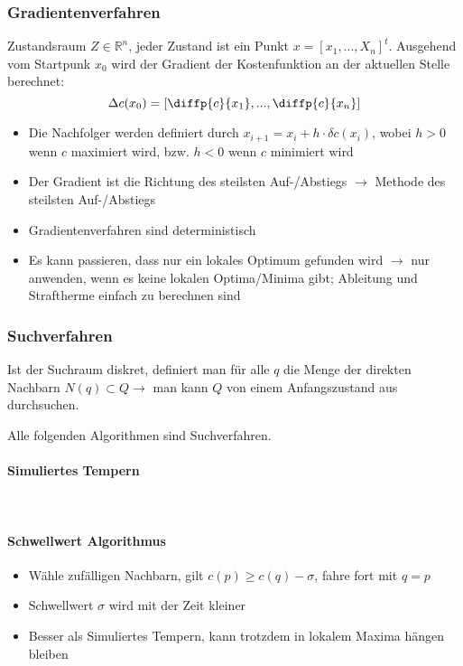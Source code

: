 \subsubsection{Gradientenverfahren}
Zustandsraum \(Z \in \mathbb{R}^n\), jeder Zustand ist ein Punkt \(x = [x_1, ... , X_n]^t\).
Ausgehend vom Startpunk $x_0$ wird der Gradient der Kostenfunktion an der aktuellen Stelle berechnet:
\[\Delta c(x_0) = \left[ \diffp{c}{{x_{1}}}, ... , \diffp{c}{{x_{n}}} \right]\]

\begin{itemize}
	\item Die Nachfolger werden definiert durch \(x_{i+1} = x_i + h \cdot \delta c(x_i)\), wobei \(h > 0\) wenn \(c\) maximiert wird, bzw. \(h < 0\) wenn \(c\) minimiert wird
	\item Der Gradient ist die Richtung des steilsten Auf-/Abstiegs $\rightarrow$ Methode des steilsten Auf-/Abstiegs
	\item Gradientenverfahren sind deterministisch
	\item Es kann passieren, dass nur ein lokales Optimum gefunden wird \(\rightarrow\) nur anwenden, wenn es keine lokalen Optima/Minima gibt; Ableitung und Straftherme einfach zu berechnen sind
\end{itemize}

\subsubsection{Suchverfahren}
Ist der Suchraum diskret, definiert man für alle \(q\) die Menge der direkten Nachbarn \(N(q) \subset Q \rightarrow\) man kann \(Q\) von einem Anfangszustand aus durchsuchen.

Alle folgenden Algorithmen sind Suchverfahren.

\paragraph{Simuliertes Tempern}
\text{}\\



\paragraph{Schwellwert Algorithmus}
\begin{itemize}
	\item Wähle zufälligen Nachbarn, gilt \(c(p) \geq c(q) - \sigma\), fahre fort mit \(q = p\)
	\item Schwellwert \(\sigma\) wird mit der Zeit kleiner
	\item Besser als Simuliertes Tempern, kann trotzdem in lokalem Maxima hängen bleiben
\end{itemize}

